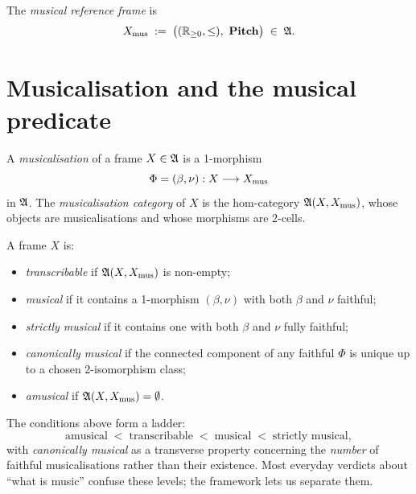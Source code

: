 \begin{definition}
The \emph{musical reference frame} is
\[
\Xmus \;:=\; \bigl((\R_{\geq 0}, \leq),\ \Pitch\bigr) \;\in\; \Frame.
\]
\end{definition}

\section{Musicalisation and the musical predicate}

\begin{definition}[Musicalisation]
A \emph{musicalisation} of a frame $X \in \mathfrak{A}$ is a 1-morphism
\[
\Phi = (\beta, \nu) : X \longrightarrow X_{\mathrm{mus}}
\]
in $\mathfrak{A}$. The \emph{musicalisation category} of $X$ is the
hom-category $\mathfrak{A}(X, X_{\mathrm{mus}})$, whose objects are musicalisations
and whose morphisms are 2-cells.
\end{definition}

\begin{definition}\label{def:predicate}
A frame $X$ is:
\begin{itemize}[leftmargin=2em]
\item \emph{transcribable} if $\mathfrak{A}(X, X_{\mathrm{mus}})$ is non-empty;
\item \emph{musical} if it contains a 1-morphism $(\beta, \nu)$ with
both $\beta$ and $\nu$ faithful;
\item \emph{strictly musical} if it contains one with both
$\beta$ and $\nu$ fully faithful;
\item \emph{canonically musical} if the connected component of any
faithful $\Phi$ is unique up to a chosen 2-isomorphism class;
\item \emph{amusical} if $\mathfrak{A}(X, X_{\mathrm{mus}}) = \emptyset$.
\end{itemize}
\end{definition}

\begin{remark}
The conditions above form a ladder:
\[
\text{amusical}
\;<\; \text{transcribable}
\;<\; \text{musical}
\;<\; \text{strictly musical},
\]
with \emph{canonically musical} as a transverse property concerning
the \emph{number} of faithful musicalisations rather than their
existence. Most everyday verdicts about ``what is music'' confuse
these levels; the framework lets us separate them.
\end{remark}

